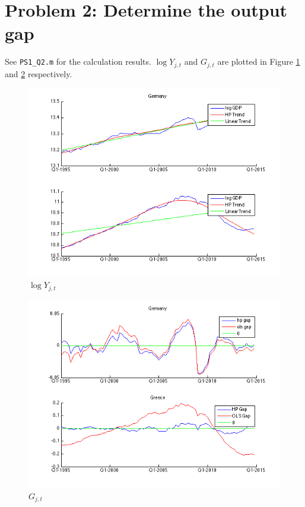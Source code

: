 \section*{Problem 2: Determine the output gap}
See \texttt{PS1\_Q2.m} for the calculation results. $\log Y_{j,t}$ and $G_{j,t}$ are plotted in Figure \ref{logY} and \ref{G} respectively.
\begin{figure}[htbp]
	\begin{center}
		\includegraphics[width=12cm]{Plot/Q2/logY.png}
		\caption{$\log Y_{j,t}$}
		\label{logY}
	\end{center}
\end{figure}
\begin{figure}[htbp]
	\begin{center}
		\includegraphics[width=12cm]{Plot/Q2/G.png}
		\caption{$G_{j,t}$}
		\label{G}
	\end{center}
\end{figure}